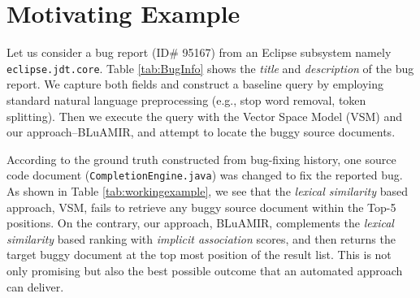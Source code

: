 \documentclass[sigconf,review,anonymous]{acmart}
\begin{document}
\section{Motivating Example}\label{sec:motivatingexample}
Let us consider a bug report (ID\# 95167) from an Eclipse subsystem namely \texttt{eclipse.jdt.core}. Table \ref{tab:BugInfo} shows the \textit{title} and \textit{description} of the bug report. We capture both fields and construct a baseline query by employing standard natural language preprocessing (e.g., stop word removal, token splitting). Then we execute the query with the Vector Space Model (VSM) and our approach--BLuAMIR, and attempt to locate the buggy source documents.

\small
\begin{table}[!tb]
	\caption{\small An Example Bug Report (\#95167, eclipse.jdt.core)}
	\label{tab:BugInfo}
	\vspace{-.3cm}
	\vspace{-.4cm}
\end{table}
\normalsize



According to the ground truth constructed from bug-fixing history, one source code document (\texttt{CompletionEngine.java}) was changed to fix the reported bug. 
As shown in Table \ref{tab:workingexample}, we see that the \emph{lexical similarity} based approach, VSM, fails to retrieve any buggy source document within the Top-5 positions. On the contrary, our approach, BLuAMIR, complements the \emph{lexical similarity} based ranking with \emph{implicit association} scores, and then returns the target buggy document at the top most position of the result list. This is not only promising but also the best possible outcome that an automated approach can deliver.   
\end{document}
